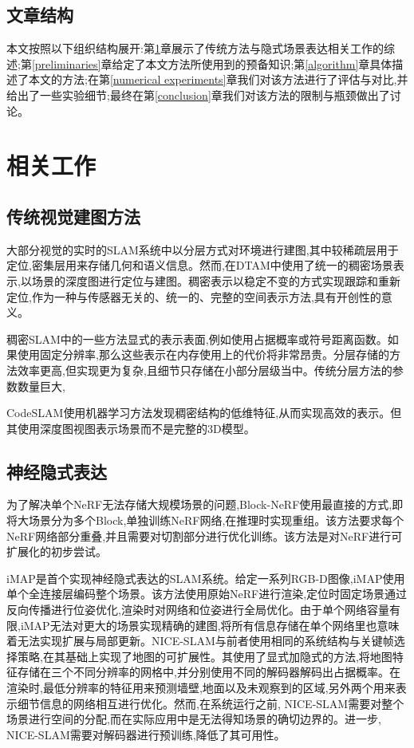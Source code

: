 \subsection{文章结构}
本文按照以下组织结构展开:第\ref{related work}章展示了传统方法与隐式场景表达相关工作的综述;第\ref{preliminaries}章给定了本文方法所使用到的预备知识;第\ref{algorithm}章具体描述了本文的方法;在第\ref{numerical experiments}章我们对该方法进行了评估与对比,并给出了一些实验细节;最终在第\ref{conclusion}章我们对该方法的限制与瓶颈做出了讨论。

\newpage
\section{相关工作}\label{related work}

\subsection{传统视觉建图方法}
大部分视觉的实时的SLAM系统中以分层方式对环境进行建图,其中较稀疏层用于定位,密集层用来存储几何和语义信息。然而,在DTAM\cite{DTAM}中使用了统一的稠密场景表示,以场景的深度图进行定位与建图。稠密表示以稳定不变的方式实现跟踪和重新定位,作为一种与传感器无关的、统一的、完整的空间表示方法,具有开创性的意义。

稠密SLAM中的一些方法显式的表示表面,例如使用占据概率或符号距离函数。如果使用固定分辨率\cite{tradition1},那么这些表示在内存使用上的代价将非常昂贵。分层存储\cite{tradition2}的方法效率更高,但实现更为复杂,且细节只存储在小部分层级当中。传统分层方法的参数数量巨大,

CodeSLAM\cite{CodeSLAM}使用机器学习方法发现稠密结构的低维特征,从而实现高效的表示。但其使用深度图视图表示场景而不是完整的3D模型。
\subsection{神经隐式表达}
为了解决单个NeRF无法存储大规模场景的问题,Block-NeRF\cite{block}使用最直接的方式,即将大场景分为多个Block,单独训练NeRF网络,在推理时实现重组。该方法要求每个NeRF网络部分重叠,并且需要对切割部分进行优化训练。该方法是对NeRF进行可扩展化的初步尝试。

iMAP\cite{imap}是首个实现神经隐式表达的SLAM系统。给定一系列RGB-D图像,iMAP使用单个全连接层编码整个场景。该方法使用原始NeRF进行渲染,定位时固定场景通过反向传播进行位姿优化,渲染时对网络和位姿进行全局优化。由于单个网络容量有限,iMAP无法对更大的场景实现精确的建图,将所有信息存储在单个网络里也意味着无法实现扩展与局部更新。NICE-SLAM\cite{nice}与前者使用相同的系统结构与关键帧选择策略,在其基础上实现了地图的可扩展性。其使用了显式加隐式的方法,将地图特征存储在三个不同分辨率的网格中,并分别使用不同的解码器解码出占据概率。在渲染时,最低分辨率的特征用来预测墙壁,地面以及未观察到的区域,另外两个用来表示细节信息的网络相互进行优化。然而,在系统运行之前, NICE-SLAM需要对整个场景进行空间的分配,而在实际应用中是无法得知场景的确切边界的。进一步, NICE-SLAM需要对解码器进行预训练,降低了其可用性。

